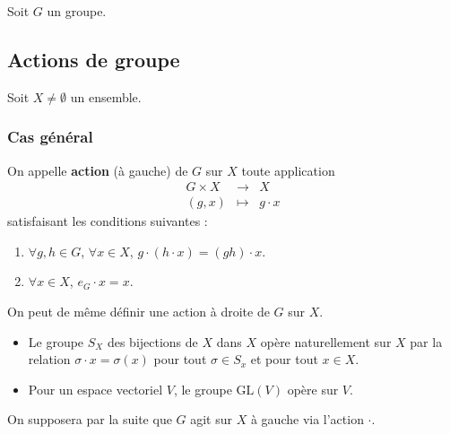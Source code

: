 



  Soit $G$ un groupe.

  \subsection{Actions de groupe}

  Soit $X \neq \emptyset$ un ensemble.

  \subsubsection{Cas général}


  \begin{definition}
    On appelle \textbf{action} (à gauche) de $G$ sur $X$ toute application
    \[
    \begin{array}{ccc}
      G \times X &\rightarrow& X \\
      (g, x) &\mapsto& g \cdot x
    \end{array}
    \]
    satisfaisant les conditions suivantes :
    \begin{enumerate}[label=(\roman*)]
      \item $\forall g, h \in G$, $\forall x \in X$, $g \cdot (h \cdot x) = (gh) \cdot x$.
      \item $\forall x \in X$, $e_G \cdot x = x$.
    \end{enumerate}
  \end{definition}

  \begin{remark}
    On peut de même définir une action à droite de $G$ sur $X$.
  \end{remark}

  \begin{example}
    \begin{itemize}
      \item Le groupe $S_X$ des bijections de $X$ dans $X$ opère naturellement sur $X$ par la relation $\sigma \cdot x = \sigma(x)$ pour tout $\sigma \in S_x$ et pour tout $x \in X$.
      \item Pour un espace vectoriel $V$, le groupe $\mathrm{GL}(V)$ opère sur $V$.
    \end{itemize}
  \end{example}

  On supposera par la suite que $G$ agit sur $X$ à gauche via l'action $\cdot$.

